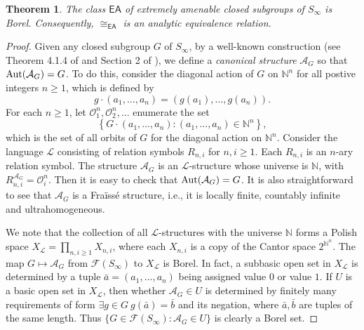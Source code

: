 \documentclass{amsart}
\newtheorem{theorem}{Theorem}[section]
\theoremstyle{definition}
\theoremstyle{remark}
\begin{document}
     \begin{theorem}\label{thm:EA}
        The class $\mathsf{EA}$ of extremely amenable closed subgroups of $S_\infty$ is Borel. Consequently, $\cong_{\mathsf{EA}}$ is an analytic equivalence relation.
     \end{theorem}
     \begin{proof}
       Given any closed subgroup $G$ of $S_\infty$, by a well-known construction (see Theorem 4.1.4 of \cite{Hodges} and Section 2 of \cite{KPT}), we define a {\em canonical structure} $\mathcal{A}_G$ so that $\mbox{\rm Aut}(\mathcal{A}_G)=G$. To do this, consider the diagonal action of $G$ on $\mathbb{N}^n$ for all postive integers $n\geq 1$, which is defined by
$$ g\cdot (a_1,\dots, a_n)=(g(a_1),\dots, g(a_n)). $$
For each $n\geq 1$, let $\mathcal{O}_1^n, \mathcal{O}_2^n, \dots$ enumerate the set
$$ \left\{G\cdot (a_1,\dots, a_n)\colon (a_1,\dots, a_n)\in \mathbb{N}^n\right\}, $$
which is the set of all orbits of $G$ for the diagonal action on $\mathbb{N}^n$. Consider the language $\mathcal{L}$ consisting of relation symbols $R_{n,i}$ for $n, i\geq 1$. Each $R_{n,i}$ is an $n$-ary relation symbol. The structure $\mathcal{A}_G$ is an $\mathcal{L}$-structure whose universe is $\mathbb{N}$, with $R_{n,i}^{\mathcal{A}_G}=\mathcal{O}_i^n$. Then it is easy to check that $\mbox{\rm Aut}(\mathcal{A}_G)=G$. It is also straightforward to see that $\mathcal{A}_G$ is a Fra\"iss\'e structure, i.e., it is locally finite, countably infinite and ultrahomogeneous.

We note that the collection of all $\mathcal{L}$-structures with the universe $\mathbb{N}$ forms a Polish space $X_{\mathcal{L}}=\prod_{n,i\geq 1} X_{n,i}$, where each $X_{n,i}$ is a copy of the Cantor space $2^{\mathbb{N}^n}$. The map $G\mapsto \mathcal{A}_G$ from $\mathcal{F}(S_\infty)$ to $X_{\mathcal{L}}$ is Borel. In fact, a subbasic open set in $X_{\mathcal{L}}$ is determined by a tuple $\bar{a}=(a_1,\dots, a_n)$ being assigned value $0$ or value $1$. If $U$ is a basic open set in $X_{\mathcal{L}}$, then whether $\mathcal{A}_G\in U$ is determined by finitely many requirements of form $\exists g\in G\ g(\bar{a})=\bar{b}$ and its negation, where $\bar{a}, \bar{b}$ are tuples of the same length. Thus $\{G\in \mathcal{F}(S_\infty)\colon \mathcal{A}_G\in U\}$ is clearly a Borel set.


\end{proof}
\end{document}
